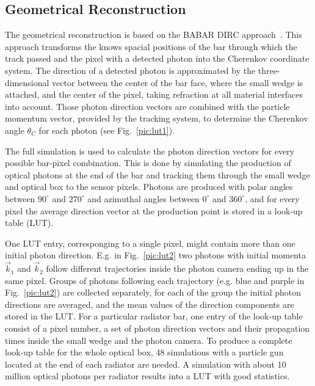 \subsection{Geometrical Reconstruction}
\label{sec:gr}

The geometrical reconstruction is based on the BABAR DIRC approach~\cite{bdirc1}. This approach transforms the knows spacial positions of the bar through which the track passed and the pixel with a detected photon into the Cherenkov coordinate system. The direction of a detected photon is approximated by the three-dimensional vector between the center of the bar face, where the small wedge is attached, and the center of the pixel, taking refraction at all material interfaces into account. Those photon direction vectors are combined with the particle momentum vector, provided by the tracking system, to determine the Cherenkov angle $\theta_{C}$ for each photon (see Fig.~\ref{pic:lut1}). 

The full simulation is used to calculate the photon direction vectors for every possible bar-pixel combination. This is done by simulating the production of optical photons at the end of the bar and tracking them through the small wedge and optical box to the sensor pixels. Photons are produced with polar angles between $90^{\circ}$ and $270^{\circ}$ and azimuthal angles between $0^{\circ}$ and $360^{\circ}$, and for every pixel the average direction vector at the production point is stored in a look-up table (LUT).

One LUT entry, corresponging to a single pixel, might contain more than one initial photon direction. E.g. in Fig.~\ref{pic:lut2} two photons with initial momenta $\vec k_1$ and $\vec k_2$ follow different trajectories inside the photon camera ending up in the same pixel. 
Groups of photons following each trajectory (e.g. blue and purple in Fig.~\ref{pic:lut2}) are collected separately, for each of the group the initial photon directions are averaged, and the mean values of the direction components are stored in the LUT. For a particular radiator bar, one entry of the look-up table consist of a pixel number, a set of photon direction vectors and their propagation times inside the small wedge and the photon camera. To produce a complete look-up table for the whole optical box, 48 simulations with a particle gun located at the end of each radiator are needed. A simulation with about 10 million optical photons per radiator results into a LUT with good statistics.

